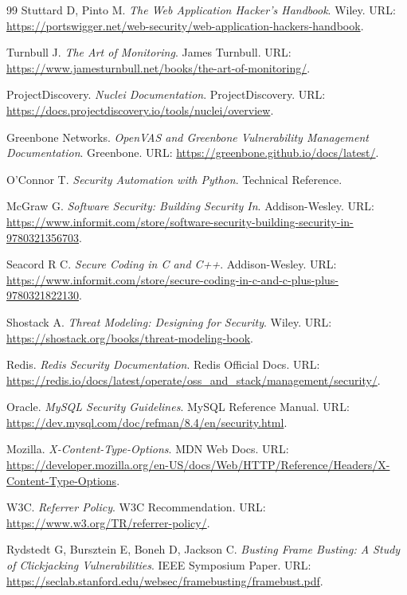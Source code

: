\documentclass[12pt,a4paper,fontset=none]{ctexart}
\begin{document}
\begin{thebibliography}{99}
Stuttard D, Pinto M. \textit{The Web Application Hacker's Handbook}. Wiley. URL: \url{https://portswigger.net/web-security/web-application-hackers-handbook}.

Turnbull J. \textit{The Art of Monitoring}. James Turnbull. URL: \url{https://www.jamesturnbull.net/books/the-art-of-monitoring/}.

ProjectDiscovery. \textit{Nuclei Documentation}. ProjectDiscovery. URL: \url{https://docs.projectdiscovery.io/tools/nuclei/overview}.

Greenbone Networks. \textit{OpenVAS and Greenbone Vulnerability Management Documentation}. Greenbone. URL: \url{https://greenbone.github.io/docs/latest/}.

O'Connor T. \textit{Security Automation with Python}. Technical Reference.

McGraw G. \textit{Software Security: Building Security In}. Addison-Wesley. URL: \url{https://www.informit.com/store/software-security-building-security-in-9780321356703}.

Seacord R C. \textit{Secure Coding in C and C++}. Addison-Wesley. URL: \url{https://www.informit.com/store/secure-coding-in-c-and-c-plus-plus-9780321822130}.

Shostack A. \textit{Threat Modeling: Designing for Security}. Wiley. URL: \url{https://shostack.org/books/threat-modeling-book}.

Redis. \textit{Redis Security Documentation}. Redis Official Docs. URL: \url{https://redis.io/docs/latest/operate/oss_and_stack/management/security/}.

Oracle. \textit{MySQL Security Guidelines}. MySQL Reference Manual. URL: \url{https://dev.mysql.com/doc/refman/8.4/en/security.html}.

Mozilla. \textit{X-Content-Type-Options}. MDN Web Docs. URL: \url{https://developer.mozilla.org/en-US/docs/Web/HTTP/Reference/Headers/X-Content-Type-Options}.

W3C. \textit{Referrer Policy}. W3C Recommendation. URL: \url{https://www.w3.org/TR/referrer-policy/}.

Rydstedt G, Bursztein E, Boneh D, Jackson C. \textit{Busting Frame Busting: A Study of Clickjacking Vulnerabilities}. IEEE Symposium Paper. URL: \url{https://seclab.stanford.edu/websec/framebusting/framebust.pdf}.


\end{thebibliography}
\end{document}
